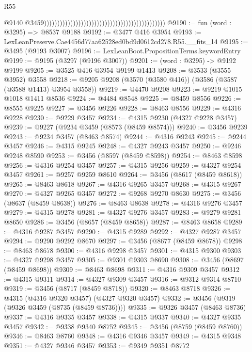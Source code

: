 \begin{lexlean}{R55}
\begin{coremodule}
                                                                                                @9140
                                                                                                @3459))))))))))))))))))))))))))))))))))))))))))))))
@9190 := fun (word : @3295) => @8537 @9188
@9192 := @3477 @416 @3954
@9193 := LexLeanPreserve.Cae4456d77aa62528ed0bd9d0612cd278.R55.__fits_14
@9195 := @3495 (@9193 @3007)
@9196 := LexLeanBoot.PropositionTerms.keywordEntry
@9199 := @9195 (@3297 (@9196 @3007))
@9201 := (word : @3295) -> @9192 @9199
@9205 := @3525 @416 @3954 @9199 @1413
@9208 := @3533 (@3555 @3952) @3558
@9218 := @9205 @9208 (@3570 (@3580 @416)) (@3586 (@3587 (@3588 @1413) @3954 @3558))
@9219 := @4470 @9208
@9223 := @9219 @1015 @1018 @1411 @8536
@9224 := @4484 @8548
@9225 := @8459 @8556
@9226 := @8555 @9225
@9227 := @3456 @9226
@9228 := @8463 @8556
@9229 := @4316 @9228
@9230 := @9229 @3457
@9234 := @4315 @9230 (@4327 @9228 @3457)
@9239 := @9227 (@9234 @3459 (@8573 (@8459 @8574)))
@9240 := @3456 @9239
@9243 := @9234 @3457 (@8463 @8574)
@9244 := @4316 @9243
@9245 := @9244 @3457
@9246 := @4315 @9245
@9248 := @4327 @9243 @3457
@9250 := @9246 @9248 @8590
@9253 := @3456 (@8597 (@8459 @8598))
@9254 := @8463 @8598
@9256 := @4316 @9254 @3457
@9257 := @4315 @9256
@9259 := @4327 @9254 @3457
@9261 := @9257 @9259 @8610
@9264 := @3456 (@8617 (@8459 @8618))
@9265 := @8463 @8618
@9267 := @4316 @9265 @3457
@9268 := @4315 @9267
@9270 := @4327 @9265 @3457
@9272 := @9268 @9270 @8630
@9275 := @3456 (@8637 (@8459 @8638))
@9276 := @8463 @8638
@9278 := @4316 @9276 @3457
@9279 := @4315 @9278
@9281 := @4327 @9276 @3457
@9283 := @9279 @9281 @8650
@9286 := @3456 (@8657 (@8459 @8658))
@9287 := @8463 @8658
@9289 := @4316 @9287 @3457
@9290 := @4315 @9289
@9292 := @4327 @9287 @3457
@9294 := @9290 @9292 @8670
@9297 := @3456 (@8677 (@8459 @8678))
@9298 := @8463 @8678
@9300 := @4316 @9298 @3457
@9301 := @4315 @9300
@9303 := @4327 @9298 @3457
@9305 := @9301 @9303 @8690
@9308 := @3456 (@8697 (@8459 @8698))
@9309 := @8463 @8698
@9311 := @4316 @9309 @3457
@9312 := @4315 @9311
@9314 := @4327 @9309 @3457
@9316 := @9312 @9314 @8710
@9319 := @3456 (@8717 (@8459 @8718))
@9320 := @8463 @8718
@9326 := @4315 (@4316 @9320 @3457) (@4327 @9320 @3457)
@9332 := @3456 (@9319 (@9326 @3459 (@8735 (@8459 @8736))))
@9335 := @9326 @3457 (@8463 @8736)
@9337 := @4316 @9335 @3457
@9338 := @4315 @9337
@9340 := @4327 @9335 @3457
@9342 := @9338 @9340 @8752
@9345 := @3456 (@8759 (@8459 @8760))
@9346 := @8463 @8760
@9348 := @4316 @9346 @3457
@9349 := @4315 @9348
@9351 := @4327 @9346 @3457
@9353 := @9349 @9351 @8772

\end{coremodule}
\end{lexlean}

